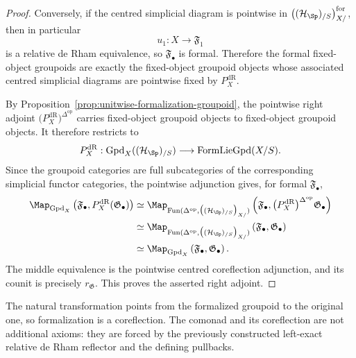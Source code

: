 \begin{proof}
Conversely, if the centred simplicial diagram is pointwise in
$\bigl((\mathcal H_{\Sp})_{/S}\bigr)_{X/}^{\mathrm{for}}$, then in particular
\[
    u_1:X\longrightarrow\mathfrak F_1
\]
is a relative de Rham equivalence, so
$\mathfrak F_\bullet$ is formal.  Therefore the formal fixed-object
groupoids are exactly the fixed-object groupoid objects whose associated
centred simplicial diagrams are pointwise fixed by $P_X^{\mathrm{dR}}$.

By Proposition~\ref{prop:unitwise-formalization-groupoid}, the pointwise right
adjoint $\bigl(P_X^{\mathrm{dR}}\bigr)^{\Delta^{\mathrm{op}}}$ carries fixed-object groupoid objects
to fixed-object groupoid objects.  It therefore restricts to
\[
    P_X^{\mathrm{dR}}:
    \operatorname{Gpd}_X((\mathcal H_{\Sp})_{/S})
    \longrightarrow
    \operatorname{FormLieGpd}(X/S).
\]
Since the groupoid categories are full subcategories of the corresponding
simplicial functor categories, the pointwise adjunction gives, for formal
$\mathfrak F_\bullet$,
\[
\begin{aligned}
    \Map_{\operatorname{Gpd}_X}
    \left(
        \mathfrak F_\bullet,
        P_X^{\mathrm{dR}}(\mathfrak G_\bullet)
    \right)
    &\simeq
    \Map_{\operatorname{Fun}
    (\Delta^{\mathrm{op}},\bigl((\mathcal H_{\Sp})_{/S}\bigr)_{X/})}
    \left(
        \mathfrak F_\bullet,
        \bigl(P_X^{\mathrm{dR}}\bigr)^{\Delta^{\mathrm{op}}}\mathfrak G_\bullet
    \right)\\
    &\simeq
    \Map_{\operatorname{Fun}
    (\Delta^{\mathrm{op}},\bigl((\mathcal H_{\Sp})_{/S}\bigr)_{X/})}
    \left(
        \mathfrak F_\bullet,
        \mathfrak G_\bullet
    \right)\\
    &\simeq
    \Map_{\operatorname{Gpd}_X}
    \left(
        \mathfrak F_\bullet,
        \mathfrak G_\bullet
    \right).
\end{aligned}
\]
The middle equivalence is the pointwise centred coreflection adjunction, and
its counit is precisely
$r_{\mathfrak G}$.  This proves the asserted right adjoint.
\end{proof}

\begin{remark}
The natural transformation points from the formalized groupoid to the original
one, so formalization is a coreflection.  The comonad and its coreflection are
not additional axioms: they are forced by the previously constructed
left-exact relative de Rham reflector and the defining pullbacks.
\end{remark}


